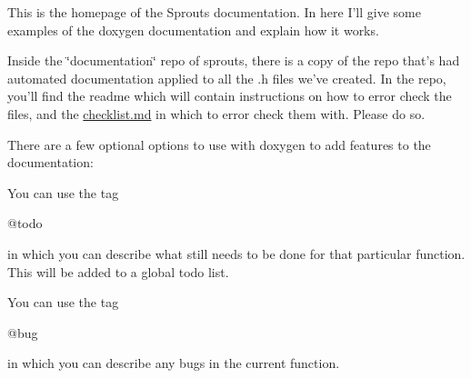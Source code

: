 This is the homepage of the Sprouts documentation. In here I'll give some examples of the doxygen documentation and explain how it works.

Inside the \char`\"{}documentation\char`\"{} repo of sprouts, there is a copy of the repo that's had automated documentation applied to all the .h files we've created. In the repo, you'll find the readme which will contain instructions on how to error check the files, and the \hyperlink{checklist_8md_source}{checklist.\+md} in which to error check them with. Please do so.

There are a few optional options to use with doxygen to add features to the documentation\+:


\begin{DoxyEnumerate}
\item You can use the tag\begin{DoxyVerb}@todo \end{DoxyVerb}
 in which you can describe what still needs to be done for that particular function. This will be added to a global todo list.
\item You can use the tag\begin{DoxyVerb}@bug \end{DoxyVerb}
 in which you can describe any bugs in the current function. 
\end{DoxyEnumerate}